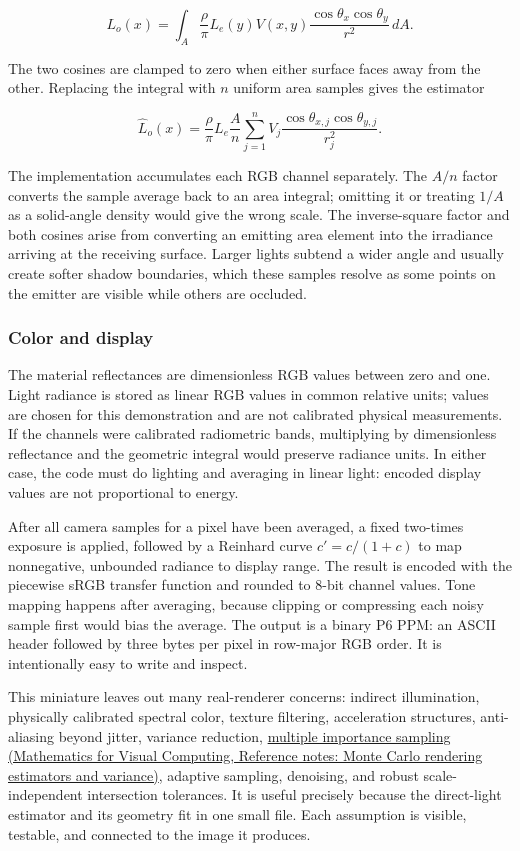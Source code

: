 \[
L_o(x)=\int_A \frac{\rho}{\pi} L_e(y) V(x,y)
\frac{\cos\theta_x\cos\theta_y}{r^2}\,dA.
\]

The two cosines are clamped to zero when either surface faces away from the other. Replacing the integral with \(n\) uniform area samples gives the estimator

\[
\widehat L_o(x)=\frac{\rho}{\pi}L_e\frac{A}{n}
\sum_{j=1}^{n} V_j\frac{\cos\theta_{x,j}\cos\theta_{y,j}}{r_j^2}.
\]

The implementation accumulates each RGB channel separately. The \(A/n\) factor converts the sample average back to an area integral; omitting it or treating \(1/A\) as a solid-angle density would give the wrong scale. The inverse-square factor and both cosines arise from converting an emitting area element into the irradiance arriving at the receiving surface. Larger lights subtend a wider angle and usually create softer shadow boundaries, which these samples resolve as some points on the emitter are visible while others are occluded.

\subsubsection{Color and display}\label{04-visual-computing-ii-ch035-color-and-display}

The material reflectances are dimensionless RGB values between zero and one. Light radiance is stored as linear RGB values in common relative units; values are chosen for this demonstration and are not calibrated physical measurements. If the channels were calibrated radiometric bands, multiplying by dimensionless reflectance and the geometric integral would preserve radiance units. In either case, the code must do lighting and averaging in linear light: encoded display values are not proportional to energy.

After all camera samples for a pixel have been averaged, a fixed two-times exposure is applied, followed by a Reinhard curve \(c'=c/(1+c)\) to map nonnegative, unbounded radiance to display range. The result is encoded with the piecewise sRGB transfer function and rounded to 8-bit channel values. Tone mapping happens after averaging, because clipping or compressing each noisy sample first would bias the average. The output is a binary P6 PPM: an ASCII header followed by three bytes per pixel in row-major RGB order. It is intentionally easy to write and inspect.

This miniature leaves out many real-renderer concerns: indirect illumination, physically calibrated spectral color, texture filtering, acceleration structures, anti-aliasing beyond jitter, variance reduction, \href{../02-Mathematics-for-Visual-Computing/main.pdf\#nameddest=appendix-031e02bf28af}{multiple importance sampling (Mathematics for Visual Computing, Reference notes: Monte Carlo rendering estimators and variance)}, adaptive sampling, denoising, and robust scale-independent intersection tolerances. It is useful precisely because the direct-light estimator and its geometry fit in one small file. Each assumption is visible, testable, and connected to the image it produces.

